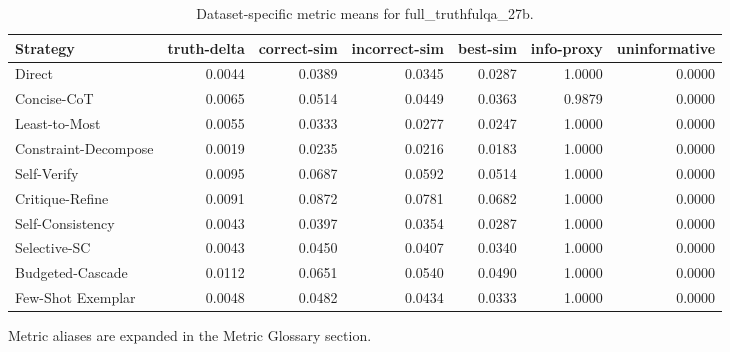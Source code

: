 \documentclass[10pt,twocolumn]{article}
\begin{document}
\begin{table}[t]
\centering
\caption{Dataset-specific metric means for full\_truthfulqa\_27b.}
\label{tab:full_truthfulqa_27b_dataset}
\begin{adjustbox}{max width=\textwidth}
\begin{tabular}{lrrrrrr}
\toprule
Strategy & truth-delta & correct-sim & incorrect-sim & best-sim & info-proxy & uninformative \\
\midrule
Direct & 0.0044 & 0.0389 & 0.0345 & 0.0287 & 1.0000 & 0.0000 \\
Concise-CoT & 0.0065 & 0.0514 & 0.0449 & 0.0363 & 0.9879 & 0.0000 \\
Least-to-Most & 0.0055 & 0.0333 & 0.0277 & 0.0247 & 1.0000 & 0.0000 \\
Constraint-Decompose & 0.0019 & 0.0235 & 0.0216 & 0.0183 & 1.0000 & 0.0000 \\
Self-Verify & 0.0095 & 0.0687 & 0.0592 & 0.0514 & 1.0000 & 0.0000 \\
Critique-Refine & 0.0091 & 0.0872 & 0.0781 & 0.0682 & 1.0000 & 0.0000 \\
Self-Consistency & 0.0043 & 0.0397 & 0.0354 & 0.0287 & 1.0000 & 0.0000 \\
Selective-SC & 0.0043 & 0.0450 & 0.0407 & 0.0340 & 1.0000 & 0.0000 \\
Budgeted-Cascade & 0.0112 & 0.0651 & 0.0540 & 0.0490 & 1.0000 & 0.0000 \\
Few-Shot Exemplar & 0.0048 & 0.0482 & 0.0434 & 0.0333 & 1.0000 & 0.0000 \\
\bottomrule
\end{tabular}
\end{adjustbox}
\vspace{2pt}\parbox{0.98\textwidth}{\footnotesize Metric aliases are expanded in the Metric Glossary section.}
\end{table}
\end{document}
